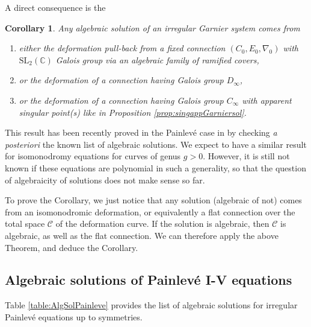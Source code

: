 \documentclass[12]{amsart}
\newtheorem{cor}[thm]{Corollary}
\begin{document}
A direct consequence is the

\begin{cor}\label{cor:structure}
Any algebraic solution of an irregular Garnier system comes from
\begin{enumerate}
\item either the deformation pull-back from a fixed connection $(C_0,E_0,\nabla_0)$ 
with $\mathrm{SL}_2(\mathbb C)$ Galois group via an algebraic family of ramified covers,
\item or the deformation of a connection having Galois group $D_\infty$,
\item or the deformation of a connection having Galois group $C_\infty$ with apparent 
singular point(s) like in Proposition \ref{prop:singappGarniersol}.
\end{enumerate}
\end{cor}

This result has been recently proved in the Painlev\'e case in \cite{OO} by checking {\it a posteriori}
the known list of algebraic solutions.
We expect to have a similar result for isomonodromy equations for curves of genus $g>0$.
However, it is still not known if these equations are polynomial in such a generality, so that the question
of algebraicity of solutions does not make sense so far.

To prove the Corollary, we just notice that any solution (algebraic of not) comes from an isomonodromic deformation,
or equivalently a flat connection over the total space $\mathcal C$ of the deformation curve. 
If the solution is algebraic, then $\mathcal C$
is algebraic, as well as the flat connection. We can therefore apply the above Theorem, and deduce the Corollary.

\subsection{Algebraic solutions of Painlev\'e I-V equations}\label{sec:AlgebraicPainleveI-V}

Table \ref{table:AlgSolPainleve} provides the list of algebraic solutions for irregular Painlev\'e equations
up to symmetries. 
\end{document}
